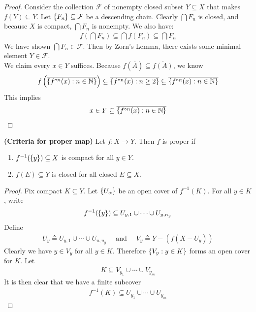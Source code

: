 \documentclass{report}
\begin{document}
\begin{proof}
Consider the collection $\mathcal{F}$ of nonempty closed subset $Y\subseteq X$ that makes $f(Y)\subseteq Y$. Let $\left\{ F_n \right\}\subseteq \mathcal{F}$ be a descending chain. Clearly $\bigcap F_n$ is closed, and because $X$ is compact, $\bigcap F_n $ is nonempty. We also have: 
\begin{align*}
f\left(\bigcap F_n\right) \subseteq \bigcap f(F_n) \subseteq \bigcap F_n
\end{align*}
We have shown  $\bigcap F_n \in \mathcal{F}$. Then by Zorn's Lemma, there exists some minimal element $Y \in \mathcal{F}$.  \\

We claim every $x \in Y$ suffices. Because $f(\overline{A})\subseteq \overline{f(A)}$, we know
\begin{align*}
f\left(\overline{\left\{ f^{\circ n}(x):n\in\mathbb{N} \right\}}\right) \subseteq \overline{\left\{ f^{\circ n}(x):n\geq 2 \right\}} \subseteq \overline{\left\{ f^{\circ n}(x):n \in\mathbb{N} \right\}} 
\end{align*}
This implies 
 \begin{align*}
x \in Y \subseteq \overline{\left\{ f^{\circ n}(x):n\in\mathbb{N} \right\}} 
\end{align*}
\end{proof}
\begin{question}{}{}
\textbf{(Criteria for proper map)} Let $f:X\rightarrow Y$. Then $f$ is proper if 
\begin{enumerate}[label=(\roman*)]
  \item $f^{-1}(\left\{ y \right\})\subseteq X$ is compact for all $y\in Y$. 
  \item $f(E)\subseteq Y$ is closed for all closed $E\subseteq X$.  
\end{enumerate}
\end{question}
\begin{proof}
Fix compact $K \subseteq Y$. Let $\left\{ U_\alpha  \right\}$ be an open cover of $f^{-1}(K)$. For all $y \in K$, write 
\begin{align*}
f^{-1}(\left\{ y \right\}) \subseteq U_{y,1} \cup  \cdots \cup  U_{y,n_y} 
\end{align*}
Define 
\begin{align*}
U_y \triangleq U_{y,1} \cup  \cdots \cup  U_{u,n_y} \quad \text{ and }\quad V_y \triangleq  Y - \left(f(X - U_y) \right) 
\end{align*}
Clearly we have $y \in V_y$ for all $y \in K$. Therefore $\left\{ V_y:y \in K \right\}$ forms an open cover for $K$. Let 
\begin{align*}
K \subseteq V_{y_1} \cup  \cdots \cup  V_{y_m}
\end{align*}
It is then clear that we have a finite subcover 
\begin{align*}
f^{-1}(K)\subseteq U_{y_1} \cup  \cdots \cup  U_{y_m}
\end{align*}
 


\end{proof}
\end{document}
